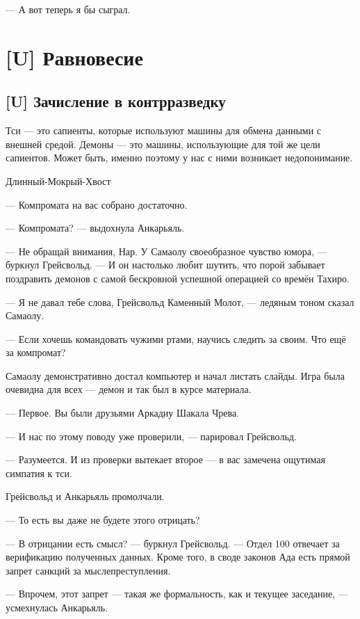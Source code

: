 --- А вот теперь я бы сыграл.

\chapter{[U] Равновесие}

\section{[U] Зачисление в контрразведку}

\epigraph
{Тси --- это сапиенты, которые используют машины для обмена данными с внешней средой.
Демоны --- это машины, использующие для той же цели сапиентов.
Может быть, именно поэтому у нас с ними возникает недопонимание.}
{Длинный-Мокрый-Хвост}

\textspace

--- Компромата на вас собрано достаточно.

--- Компромата? --- выдохнула Анкарьяль.

--- Не обращай внимания, Нар.
У Самаолу своеобразное чувство юмора, --- буркнул Грейсвольд.
--- И он настолько любит шутить, что порой забывает поздравить демонов с самой бескровной успешной операцией со времён Тахиро.

--- Я не давал тебе слова, Грейсвольд Каменный Молот, --- ледяным тоном сказал Самаолу.

--- Если хочешь командовать чужими ртами, научись следить за своим.
Что ещё за компромат?

Самаолу демонстративно достал компьютер и начал листать слайды.
Игра была очевидна для всех --- демон и так был в курсе материала.

--- Первое.
Вы были друзьями Аркадиу Шакала Чрева.

--- И нас по этому поводу уже проверили, --- парировал Грейсвольд.

--- Разумеется.
И из проверки вытекает второе --- в вас замечена ощутимая симпатия к тси.

Грейсвольд и Анкарьяль промолчали.

--- То есть вы даже не будете этого отрицать?

--- В отрицании есть смысл? --- буркнул Грейсвольд.
--- Отдел 100 отвечает за верификацию полученных данных.
Кроме того, в своде законов Ада есть прямой запрет санкций за мыслепреступления.

--- Впрочем, этот запрет --- такая же формальность, как и текущее заседание, --- усмехнулась Анкарьяль.


